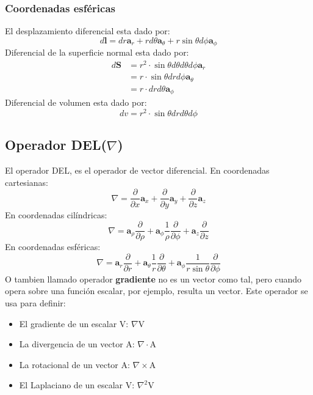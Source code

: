 \documentclass[
	12pt, %
	fleqn, %
	a4paper, %
]{LegrandOrangeBook}
\begin{document}
\subsubsection{Coordenadas esféricas}
El desplazamiento diferencial esta dado por:
\begin{equation}
\boxed{d\textbf{l}=dr\textbf{a}_r+r d\theta\textbf{a}_{\theta}+r\sin\theta d\phi\textbf{a}_{\phi}}
\end{equation}
Diferencial de la superficie normal esta dado por:
\begin{equation}
\boxed{\begin{split}
d\textbf{S}&=r^2\cdot\sin\theta d\theta d\theta d\phi \textbf{a}_r\\
&=r\cdot\sin\theta dr d\phi\textbf{a}_{\theta}\\
&=r\cdot dr d\theta\textbf{a}_{\phi}
\end{split}}
\end{equation}
Diferencial de volumen esta dado por:
\begin{equation}
\boxed{dv=r^2\cdot\sin\theta dr d\theta d\phi}
\end{equation}
\subsection{Operador DEL($\nabla$)}\label{subsec:DEL}
El operador DEL, es el operador de vector diferencial. En coordenadas cartesianas:
\begin{equation}
\boxed{\nabla=\frac{\partial}{\partial x}\textbf{a}_x+\frac{\partial}{\partial y}\textbf{a}_y+\frac{\partial}{\partial z}\textbf{a}_z}
\end{equation}
En coordenadas cilíndricas:
\begin{equation}
\boxed{\nabla=\textbf{a}_{\rho}\frac{\partial}{\partial\rho}+\textbf{a}_{\phi}\frac{1}{\rho}\frac{\partial}{\partial\phi}+\textbf{a}_z\frac{\partial}{\partial z}}
\end{equation}
En coordenadas esféricas:
\begin{equation}
\boxed{\nabla=\textbf{a}_r\frac{\partial}{\partial r}+\textbf{a}_{\theta}\frac{1}{r}\frac{\partial}{\partial\theta}+\textbf{a}_{\phi}\frac{1}{r\sin\theta}\frac{\partial}{\partial \phi}}
\end{equation}
O tambien llamado operador \textbf{gradiente} no es un vector como tal, pero cuando opera sobre una función escalar, por ejemplo, resulta un vector. Este operador se usa para definir:
\begin{itemize}
\item El gradiente de un escalar V: $\nabla$V
\item La divergencia de un vector A: $\nabla\cdot$A
\item La rotacional de un vector A: $\nabla\times$A
\item El Laplaciano de un escalar V: $\nabla^2$V
\end{itemize}
\end{document}
